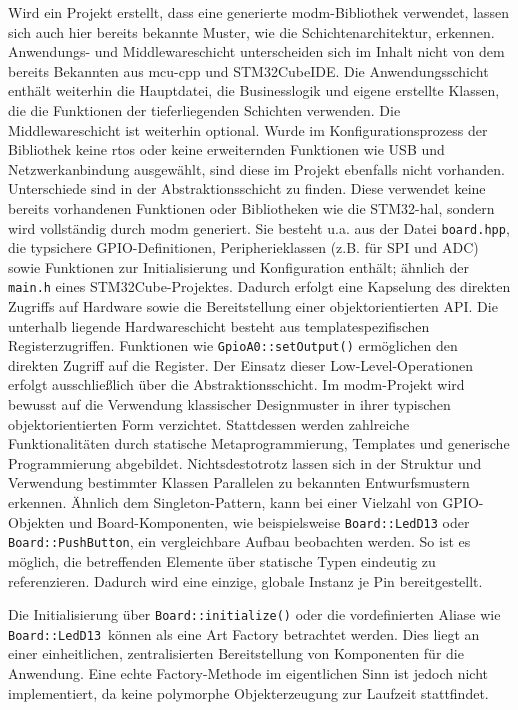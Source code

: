 Wird ein Projekt erstellt, dass eine generierte modm-Bibliothek verwendet, lassen sich auch hier bereits bekannte Muster, wie die Schichtenarchitektur, erkennen.
Anwendungs- und Middlewareschicht unterscheiden sich im Inhalt nicht von dem bereits Bekannten aus mcu-cpp und STM32CubeIDE.
Die Anwendungsschicht enthält weiterhin die Hauptdatei, die Businesslogik und eigene erstellte Klassen, die die Funktionen der tieferliegenden Schichten verwenden.
Die Middlewareschicht ist weiterhin optional.
Wurde im Konfigurationsprozess der Bibliothek keine \gls{rtos} oder keine erweiternden Funktionen wie USB und Netzwerkanbindung ausgewählt, sind diese im Projekt ebenfalls nicht vorhanden.
Unterschiede sind in der Abstraktionsschicht zu finden.
Diese verwendet keine bereits vorhandenen Funktionen oder Bibliotheken wie die STM32-\gls{hal}, sondern wird vollständig durch modm generiert.
Sie besteht u.a. aus der Datei \texttt{board.hpp}, die typsichere GPIO-Definitionen, Peripherieklassen (z.B. für SPI und ADC) sowie Funktionen zur Initialisierung und Konfiguration enthält; ähnlich der \texttt{main.h} eines STM32Cube-Projektes.
Dadurch erfolgt eine Kapselung des direkten Zugriffs auf Hardware sowie die Bereitstellung einer objektorientierten API.
Die unterhalb liegende Hardwareschicht besteht aus templatespezifischen Registerzugriffen. 
Funktionen wie \texttt{GpioA0::setOutput()} ermöglichen den direkten Zugriff auf die Register. 
Der Einsatz dieser Low-Level-Operationen erfolgt ausschließlich über die Abstraktionsschicht.
Im modm-Projekt wird bewusst auf die Verwendung klassischer Designmuster in ihrer typischen objektorientierten Form verzichtet. 
Stattdessen werden zahlreiche Funktionalitäten durch statische Metaprogrammierung, Templates und generische Programmierung abgebildet. 
Nichtsdestotrotz lassen sich in der Struktur und Verwendung bestimmter Klassen Parallelen zu bekannten Entwurfsmustern erkennen.
Ähnlich dem Singleton-Pattern, kann bei einer Vielzahl von GPIO-Objekten und Board-Komponenten, wie beispielsweise \texttt{Board::LedD13} oder \texttt{Board::PushButton}, ein vergleichbare Aufbau beobachten werden.
So ist es möglich, die betreffenden Elemente über statische Typen eindeutig zu referenzieren. 
Dadurch wird eine einzige, globale Instanz je Pin bereitgestellt.

Die Initialisierung über \texttt{Board::initialize()} oder die vordefinierten Aliase wie \texttt{Board::LedD13} können als eine Art Factory betrachtet werden. 
Dies liegt an einer einheitlichen, zentralisierten Bereitstellung von Komponenten für die Anwendung.
Eine echte Factory-Methode im eigentlichen Sinn ist jedoch nicht implementiert, da keine polymorphe Objekterzeugung zur Laufzeit stattfindet.

